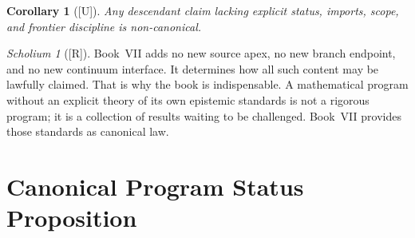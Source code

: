 \documentclass[12pt,oneside]{amsbook}
\theoremstyle{plain}
\newtheorem{corollary}[theorem]{Corollary}
\theoremstyle{definition}
\theoremstyle{remark}
\newtheorem{scholium}[theorem]{Scholium}
\newcommand{\status}[1]{\textup{[#1]}}
\begin{document}
\begin{corollary}[\status{U}]\label{cor:noncompliant-noncanonicalnical}
Any descendant claim lacking explicit status, imports, scope, and
frontier discipline is non-canonical.
\end{corollary}

\begin{scholium}[\status{R}]\label{sch:VII-indispensable}
Book~VII adds no new source apex, no new branch endpoint, and no new
continuum interface.  It determines how all such content may be
lawfully claimed.  That is why the book is indispensable.  A
mathematical program without an explicit theory of its own epistemic
standards is not a rigorous program; it is a collection of results
waiting to be challenged.  Book~VII provides those standards as
canonical law.
\end{scholium}

\section{Canonical Program Status Proposition}
\label{sec:program-status}
\end{document}
